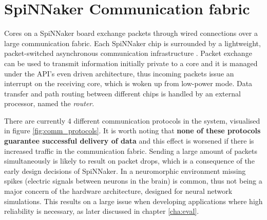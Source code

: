 \section{SpiNNaker Communication fabric}
\label{sec:comm_fabric}

Cores on a SpiNNaker board exchange packets through wired connections over a large communication fabric. Each SpiNNaker chip is surrounded by a lightweight, packet-switched asynchronous communication infrastructure \cite{spinnchip}. Packet exchange can be used to transmit information initially private to a core and it is managed under the API's even driven architecture, thus incoming packets issue an interrupt on the receiving core, which is woken up from low-power mode. Data transfer and path routing between different chips is handled by an external processor, named the \textit{router}.

There are currently 4 different communication protocols in the system, visualised in figure \ref{fig:comm_protocols}. It is worth noting that \textbf{none of these protocols guarantee successful delivery of data} and this effect is worsened if there is increased traffic in the communication fabric. Sending a large amount of packets simultaneously is likely to result on packet drops, which is a consequence of the early design decisions of SpiNNaker. In a neuromorphic environment missing spikes (electric signals between neurons in the brain) is common, thus not being a major concern of the hardware architecture, designed for neural network simulations. This results on a large issue when developing applications where high reliability is necessary, as later discussed in chapter \ref{cha:eval}.


